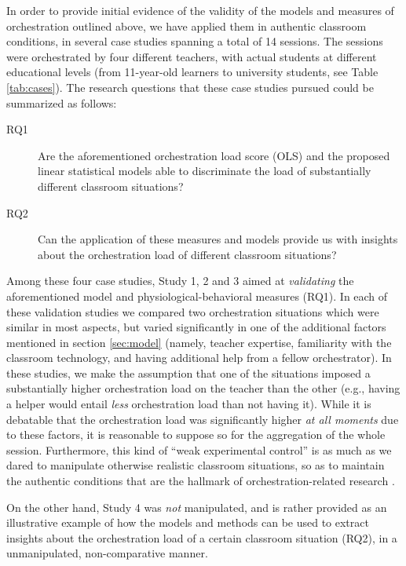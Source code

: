 \documentclass[10pt,journal,compsoc]{IEEEtran}
\begin{document}
In order to provide initial evidence of the validity of the models and measures of orchestration outlined above, we have applied them in authentic classroom conditions, in several case studies spanning a total of 14 sessions. The sessions were orchestrated by four different teachers, with actual students at different educational levels (from 11-year-old learners to university students, see Table \ref{tab:cases}). The research questions that these case studies pursued could be summarized as follows:

\begin{description}
\item[RQ1] Are the aforementioned orchestration load score (OLS) and the proposed linear statistical models able to discriminate the load of substantially different classroom situations?
\item[RQ2] Can the application of these measures and models provide us with insights about the orchestration load of different classroom situations?
\end{description}

Among these four case studies, Study 1, 2 and 3 aimed at \textit{validating} the aforementioned model and physiological-behavioral measures (RQ1). In each of these validation studies we compared two orchestration situations which were similar in most aspects, but varied significantly in one of the additional factors mentioned in section \ref{sec:model} (namely, teacher expertise, familiarity with the classroom technology, and having additional help from a fellow orchestrator). In these studies, we make the assumption that one of the situations imposed a substantially higher orchestration load on the teacher than the other (e.g., having a helper would entail \textit{less} orchestration load than not having it). While it is debatable that the orchestration load was significantly higher \textit{at all moments} due to these factors, it is reasonable to suppose so for the aggregation of the whole session. Furthermore, this kind of ``weak experimental control'' is as much as we dared to manipulate otherwise realistic classroom situations, so as to maintain the authentic conditions that are the hallmark of orchestration-related research \cite{Roschelle2013}.

On the other hand, Study 4 was \textit{not} manipulated, and is rather provided as an illustrative example of how the models and methods can be used to extract insights about the orchestration load of a certain classroom situation (RQ2), in a unmanipulated, non-comparative manner.
\end{document}
